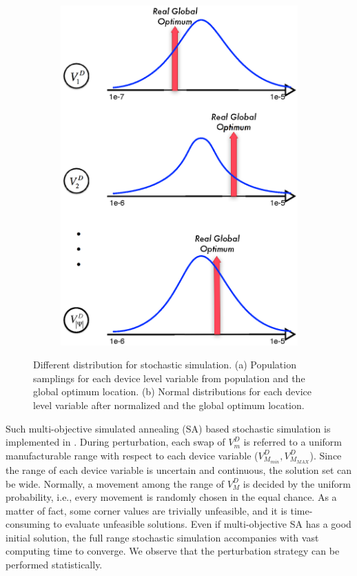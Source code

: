 \begin{figure}[t]
\begin{subfigure}[t]{0.4\textwidth}
        \includegraphics[width=\textwidth]{Fig/norPopDis.eps}
      \end{subfigure}
      \caption
      {
        Different distribution for stochastic simulation. (a) Population samplings for each device level variable from population and the global optimum location. (b) Normal distributions for each device level variable after normalized and the global optimum location.
      }\label{fig:optimumValleys}
  \end{figure}

  Such multi-objective simulated annealing (SA) based stochastic simulation is implemented in \cite{PerfMap_ISQED2011}. During perturbation, each swap of $V^D_m$ is referred to a uniform manufacturable range with respect to each device variable ($V^D_{M_{min}},V^D_{M_{MAX}}$). Since the range of each device variable is uncertain and continuous, the solution set can be wide. Normally, a movement among the range of $V^D_M$ is decided by the uniform probability, i.e., every movement is randomly chosen in the equal chance. As a matter of fact, some corner values are trivially unfeasible, and it is time-consuming to evaluate unfeasible solutions. Even if multi-objective SA has a good initial solution, the full range stochastic simulation accompanies with vast computing time to converge. We observe that the perturbation strategy can be performed statistically. 
    

